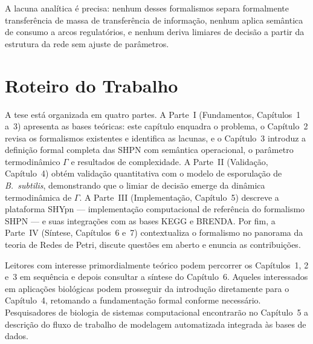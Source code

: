 A lacuna analítica é precisa: nenhum desses formalismos separa formalmente
transferência de massa de transferência de informação, nenhum aplica semântica
de consumo a arcos regulatórios, e nenhum deriva limiares de decisão a
partir da estrutura da rede sem ajuste de parâmetros.

\section{Roteiro do Trabalho}
\label{sec:roteiro}

A tese está organizada em quatro partes. A Parte~I (Fundamentos, Capítulos~1
a~3) apresenta as bases teóricas: este capítulo enquadra o problema, o
Capítulo~2 revisa os formalismos existentes e identifica as lacunas, e o
Capítulo~3 introduz a definição formal completa das SHPN com semântica
operacional, o parâmetro termodinâmico $\Gamma$ e resultados de complexidade.
A Parte~II (Validação, Capítulo~4) obtém validação quantitativa com o
modelo de esporulação de \textit{B.~subtilis}, demonstrando que o limiar de
decisão emerge da dinâmica termodinâmica de $\Gamma$. A Parte~III
(Implementação, Capítulo~5) descreve a plataforma SHYpn --- implementação
computacional de referência do formalismo SHPN --- e suas integrações com as
bases KEGG e BRENDA.
Por fim, a Parte~IV (Síntese, Capítulos~6 e~7) contextualiza o
formalismo no panorama da teoria de Redes de Petri, discute questões em aberto
e enuncia as contribuições.

Leitores com interesse primordialmente teórico podem percorrer os Capítulos~1,
2 e~3 em sequência e depois consultar a síntese do Capítulo~6. Aqueles
interessados em aplicações biológicas podem prosseguir da introdução diretamente
para o Capítulo~4, retomando a fundamentação formal conforme necessário.
Pesquisadores de biologia de sistemas computacional encontrarão no Capítulo~5 a
descrição do fluxo de trabalho de modelagem automatizada integrada às bases de
dados.
